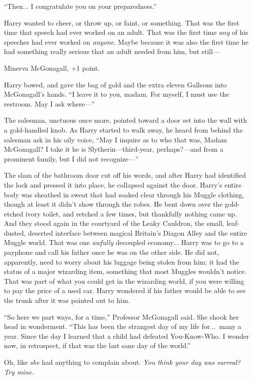 “Then... I congratulate you on your preparedness.”

Harry wanted to cheer, or throw up, or faint, or something. That was the first time that speech had ever worked on an adult. That was the first time \emph{any} of his speeches had ever worked on \emph{anyone}. Maybe because it was also the first time he had something really serious that an adult needed from him, but still—

Minerva McGonagall, +1 point.

Harry bowed, and gave the bag of gold and the extra eleven Galleons into McGonagall’s hands. “I leave it to you, madam. For myself, I must use the restroom. May I ask where—”

The salesman, unctuous once more, pointed toward a door set into the wall with a gold-handled knob. As Harry started to walk away, he heard from behind the salesman ask in his oily voice, “May I inquire as to who that was, Madam McGonagall? I take it he is Slytherin—third-year, perhaps?—and from a prominent family, but I did not recognize—”

The slam of the bathroom door cut off his words, and after Harry had identified the lock and pressed it into place, he collapsed against the door. Harry’s entire body was sheathed in sweat that had soaked clear through his Muggle clothing, though at least it didn’t show through the robes. He bent down over the gold-etched ivory toilet, and retched a few times, but thankfully nothing came up.
\sbreak
And they stood again in the courtyard of the Leaky Cauldron, the small, leaf-dusted, deserted interface between magical Britain’s Diagon Alley and the entire Muggle world. That was one \emph{awfully} decoupled economy... Harry was to go to a payphone and call his father once he was on the other side. He did not, apparently, need to worry about his luggage being stolen from him; it had the status of a major wizarding item, something that most Muggles wouldn’t notice. That was part of what you could get in the wizarding world, if you were willing to pay the price of a used car. Harry wondered if his father would be able to see the trunk after it was pointed out to him.

“So here we part ways, for a time,” Professor McGonagall said. She shook her head in wonderment. “This has been the strangest day of my life for...\ many a year. Since the day I learned that a child had defeated You-Know-Who. I wonder now, in retrospect, if that was the last sane day of the world.”

Oh, like \emph{she} had anything to complain about. \emph{You think your day was surreal? Try mine.}


